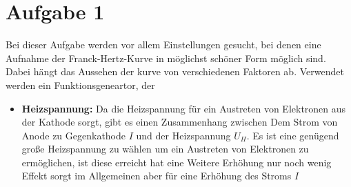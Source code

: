 \section{Aufgabe 1}
Bei dieser Aufgabe werden vor allem Einstellungen gesucht, bei denen eine Aufnahme der Franck-Hertz-Kurve in möglichst schöner Form möglich sind. Dabei hängt das Aussehen der kurve von verschiedenen Faktoren ab. Verwendet werden ein Funktionsgeneartor, der 
\begin{itemize}
\item[] \textbf{Heizspannung:} Da die Heizspannung für ein Austreten von Elektronen aus der Kathode sorgt, gibt es einen Zusammenhang zwischen Dem Strom von Anode zu Gegenkathode \(I\) und der Heizspannung \(U_H\). Es ist eine genügend große Heizspannung zu wählen um ein Austreten von Elektronen zu ermöglichen, ist diese erreicht hat eine Weitere Erhöhung nur noch wenig Effekt sorgt im Allgemeinen aber für eine Erhöhung des Stroms \(I\)
\end{itemize}